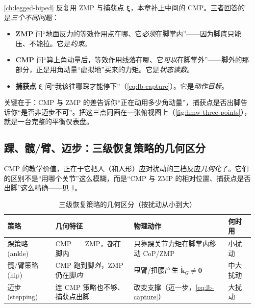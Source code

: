 \begin{insight}\label{ins:hmw-three-points}
\cref{ch:legged-biped} 反复用 ZMP 与捕获点 $\boldsymbol\xi$，本章补上中间的 CMP。三者回答的是\emph{三个不同问题}：
\begin{itemize}
  \item \textbf{ZMP} 问“地面反力的等效作用点在哪、它\emph{必须}在脚掌内”——因为脚底只能压、不能拉。它是\emph{约束}。
  \item \textbf{CMP} 问“算上角动量后，等效作用线落在哪、它\emph{可以}在脚掌外”——脚外的那部分，正是用角动量“虚拟地”买来的力矩。它是\emph{状态读数}。
  \item \textbf{捕获点} $\boldsymbol\xi$ 问“我该往哪踩才能停下”（\cref{eq:lb-capture}）。它是\emph{动作目标}。
\end{itemize}
关键在于：CMP 与 ZMP 的差告诉你“正在动用多少角动量”，捕获点是否出脚告诉你“是否非迈步不可”。把这三点同画在一张俯视图上（\cref{fig:hmw-three-points}），就是一台完整的平衡仪表盘。
\end{insight}

\subsection{踝、髋/臂、迈步：三级恢复策略的几何区分}
\label{subsec:hmw-three-strategies}

CMP 的教学价值，正在于它把人（和人形）应对扰动的三档反应\emph{几何化}了。它们的区别不是“用哪个关节”这么模糊，而是“CMP 与 ZMP 的相对位置、捕获点是否出脚”这么精确——见 \cref{tab:hmw-strategies}。

\begin{table}[H]\centering\small
\caption{三级恢复策略的几何区分（按扰动从小到大）}
\begin{tabular}{p{} p{} p{} p{}}
\toprule
策略 & 几何特征 & 物理动作 & 何时用 \\
\midrule
踝策略 (ankle) & CMP $=$ ZMP，都在脚内 & 只靠踝关节力矩在脚掌内移动 CoP/ZMP & 小扰动 \\
髋/臂策略 (hip) & CMP 跑到脚\emph{外}，ZMP 仍在脚\emph{内} & 甩臂/扭腰产生 $\dot{\mathbf k}_G\ne\mathbf 0$ & 中大扰动 \\
迈步 (stepping) & 连 CMP 策略也不够、捕获点出脚 & 改变支撑（迈一步，\cref{eq:lb-capture}） & 大扰动 \\
\bottomrule
\end{tabular}
\label{tab:hmw-strategies}
\end{table}

